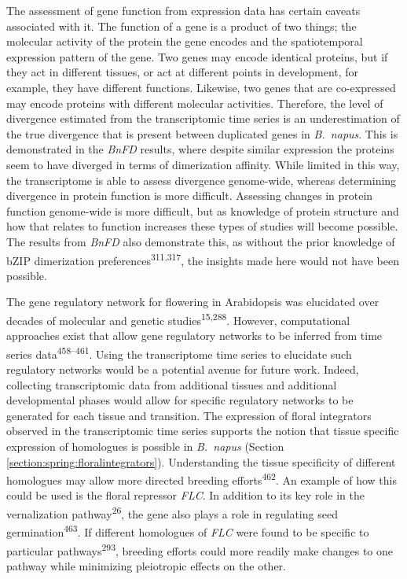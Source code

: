 \documentclass[12pt,]{book}
\begin{document}
The assessment of gene function from expression data has certain caveats
associated with it. The function of a gene is a product of two things;
the molecular activity of the protein the gene encodes and the
spatiotemporal expression pattern of the gene. Two genes may encode
identical proteins, but if they act in different tissues, or act at
different points in development, for example, they have different
functions. Likewise, two genes that are co-expressed may encode proteins
with different molecular activities. Therefore, the level of divergence
estimated from the transcriptomic time series is an underestimation of
the true divergence that is present between duplicated genes in
\emph{B.~napus}. This is demonstrated in the \emph{BnFD} results, where
despite similar expression the proteins seem to have diverged in terms
of dimerization affinity. While limited in this way, the transcriptome
is able to assess divergence genome-wide, whereas determining divergence
in protein function is more difficult. Assessing changes in protein
function genome-wide is more difficult, but as knowledge of protein
structure and how that relates to function increases these types of
studies will become possible. The results from \emph{BnFD} also
demonstrate this, as without the prior knowledge of bZIP dimerization
preferences\textsuperscript{311,317}, the insights made here would not
have been possible.

The gene regulatory network for flowering in Arabidopsis was elucidated
over decades of molecular and genetic studies\textsuperscript{15,288}.
However, computational approaches exist that allow gene regulatory
networks to be inferred from time series data\textsuperscript{458--461}.
Using the transcriptome time series to elucidate such regulatory
networks would be a potential avenue for future work. Indeed, collecting
transcriptomic data from additional tissues and additional developmental
phases would allow for specific regulatory networks to be generated for
each tissue and transition. The expression of floral integrators
observed in the transcriptomic time series supports the notion that
tissue specific expression of homologues is possible in \emph{B.~napus}
(Section \ref{section:spring:floralintegrators}). Understanding the
tissue specificity of different homologues may allow more directed
breeding efforts\textsuperscript{462}. An example of how this could be
used is the floral repressor \emph{FLC}. In addition to its key role in
the vernalization pathway\textsuperscript{26}, the gene also plays a
role in regulating seed germination\textsuperscript{463}. If different
homologues of \emph{FLC} were found to be specific to particular
pathways\textsuperscript{293}, breeding efforts could more readily make
changes to one pathway while minimizing pleiotropic effects on the
other.
\end{document}
